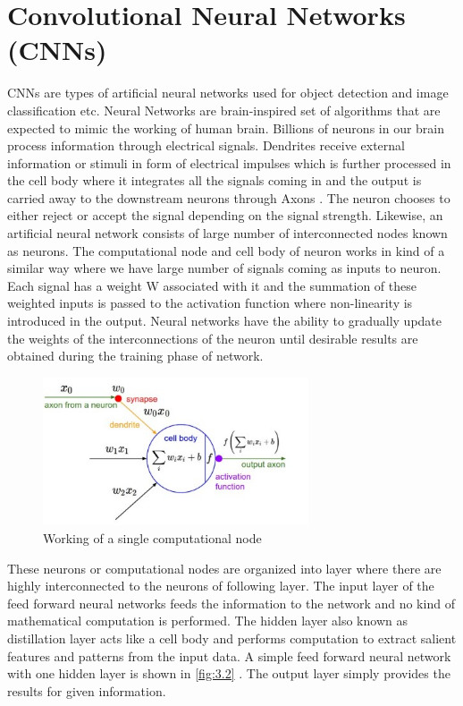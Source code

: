 \chapter{Convolutional Neural Networks (CNNs)}
\label{Chapter 3}

CNNs are types of artificial neural networks used 
for object detection and image classification etc. Neural Networks 
are brain-inspired set of algorithms that are expected to mimic the working 
of human brain. Billions of neurons in our brain process information through 
electrical signals. Dendrites receive external information or stimuli in form of 
electrical impulses which is further processed in the cell body where it integrates 
all the signals coming in and the output is carried away to the downstream neurons 
through Axons \cite{chap_3_article:1}. The neuron chooses to either reject or accept the signal 
depending on the signal strength. Likewise, an artificial neural network consists of large 
number of interconnected nodes known as neurons. The computational node and cell body of 
neuron works in kind of a similar way where we have large number of signals 
coming as inputs to neuron. Each signal has a weight W associated with it and the 
summation of these weighted inputs is passed to the activation function where 
 non-linearity is introduced in the output. Neural networks have the ability to gradually 
update the weights of the interconnections of the neuron until desirable results 
are obtained during the training phase of network.

\begin{figure}[H]
	\centering
		\includegraphics[width=0.70\textwidth]{CHAPTERS/Chapter-3/Images/3_1.jpg}
	\caption{Working of a single computational node}
	\label{fig:3.1}
\end{figure}

These neurons or computational nodes are organized 
into layer where there are highly interconnected to the neurons 
of following layer. The input layer of the feed forward neural 
networks feeds the information to the network and no kind of mathematical 
computation is performed. The hidden layer also known as distillation layer 
acts like a cell body and performs computation to extract salient features and 
patterns from the input data. A simple feed forward neural network with one 
hidden layer is shown in \ref{fig:3.2} \cite{chap_3_article:2}.
The output layer simply provides the results for given information. 

